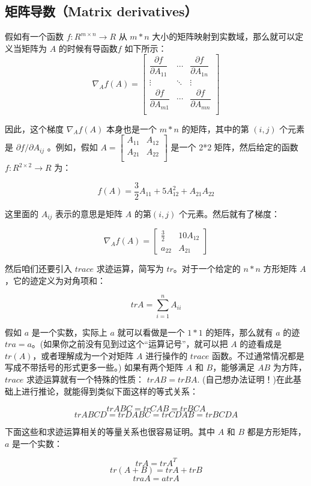 \documentclass[UTF8]{ctexart}
\begin{document}
		\subsection{矩阵导数（Matrix derivatives）}
		假如有一个函数 $ f : R^{m×n} \longrightarrow R $ 从 $ m * n $ 大小的矩阵映射到实数域，那么就可以定义当矩阵为 $A$ 的时候有导函数$ f $ 如下所示：
		\[ \nabla_{A}f(A)=\begin{bmatrix}
		\dfrac{\partial f}{\partial A_{11}} & \cdots & \dfrac{\partial f}{\partial A_{1n}}\\
		\vdots & \ddots & \vdots \\
		\dfrac{\partial f}{\partial A_{m1}} & \cdots & \dfrac{\partial f}{\partial A_{mn}}\\
		\end{bmatrix}  \]
		
		因此，这个梯度 $ \nabla_{A}f(A) $  本身也是一个 $m*n$ 的矩阵，其中的第 $(i,j)$ 个元素是 $ \partial f / \partial A_{ij} $ 。例如，假如 $ A=\begin{bmatrix}
		A_{11} & A_{12} \\ A_{21} & A_{22} \\
		\end{bmatrix} $ 是一个 2*2 矩阵，然后给定的函数 $f : R^{2×2} \longrightarrow R$ 为：
		
		\[ f(A) = \frac{3}{2}A_{11} + 5A^{2}_{12} + A_{21}A_{22} \]
		
		这里面的 $ A_{ij} $ 表示的意思是矩阵 $A$ 的第$(i,j)$ 个元素。然后就有了梯度：
		
		\[ \nabla_{A}f(A) = \begin{bmatrix}
		\frac{3}{2} & 10A_{12} \\ a_{22} & A_{21}
		\end{bmatrix} \]
		
		然后咱们还要引入 $trace$ 求迹运算，简写为 $tr$。对于一个给定的 $n*n$ 方形矩阵 $A$，它的迹定义为对角项和：
		
		\[ trA= \sum^{n}_{i=1}A_{ii} \]
		
		假如 $a$ 是一个实数，实际上 $a$ 就可以看做是一个 $1*1$ 的矩阵，那么就有 $a$ 的迹 $tr a = a$。(如果你之前没有见到过这个“运算记号”，就可以把 $A$ 的迹看成是 $tr(A)$，或者理解成为一个对矩阵 $A$ 进行操作的 $trace$ 函数。不过通常情况都是写成不带括号的形式更多一些。) 
		如果有两个矩阵 $A$ 和 $B$，能够满足 $AB$ 为方阵，$trace$ 求迹运算就有一个特殊的性质： $trAB = trBA$. (自己想办法证明！)在此基础上进行推论，就能得到类似下面这样的等式关系： 
		
		\[ trABC = trCAB = trBCA  \]
		\[ trABCD = trDABC = trCDAB = trBCDA \]
		
		下面这些和求迹运算相关的等量关系也很容易证明。其中 $A$ 和 $B$ 都是方形矩阵，$a$ 是一个实数： 
		
		\[ trA = trA^{T} \]
		\[ tr(A+B) = trA + trB\]
		\[ traA = atrA\]
		
		
		
		
\end{document}
